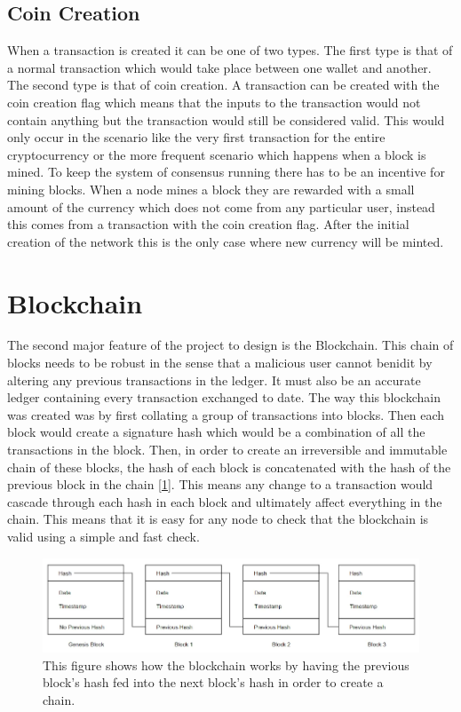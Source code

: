 \documentclass{l4proj}
\begin{document}
\subsection{Coin Creation}
When a transaction is created it can be one of two types. The first type is that of a normal transaction which would take place
between one wallet and another. The second type is that of coin creation. A transaction can be created with the 
coin creation flag which means that the inputs to the transaction would not contain anything but the transaction
would still be considered valid. This would only occur in the scenario like the very first transaction for the entire
cryptocurrency or the more frequent scenario which happens when a block is mined. To keep the system of consensus 
running there has to be an incentive for mining blocks. When a node mines a block they are rewarded with a small
amount of the currency which does not come from any particular user, instead this comes from a transaction with the
coin creation flag. After the initial creation of the network this is the only case where new currency will be
minted.

\section{Blockchain}
The second major feature of the project to design is the Blockchain. This chain of blocks needs to be robust in
the sense that a malicious user cannot benidit by altering any previous transactions in the ledger. It must
also be an accurate ledger containing every transaction exchanged to date. The way this blockchain was created was
by first collating a group of transactions into blocks. Then each block would create a signature hash which would
be a combination of all the transactions in the block. Then, in order to create an irreversible and immutable chain
of these blocks, the hash of each block is concatenated with the hash of the previous block in the chain [\ref{fig:blockchainDiagram}]. This means
any change to a transaction would cascade through each hash in each block and ultimately affect everything in the
chain. This means that it is easy for any node to check that the blockchain is valid using a simple and fast check.

\begin{figure}[!ht]
    \centering
    \includegraphics[width=1\linewidth]{images/blockchaindiagram.png}    

    \caption{
        This figure shows how the blockchain works by having the previous block's hash fed into the next
        block's hash in order to create a chain.
    }

    \label{fig:blockchainDiagram} 
\end{figure}
\end{document}
